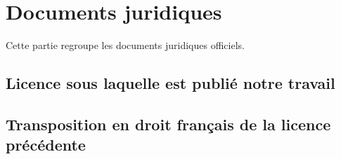 \chapter{Documents juridiques}
\label{chap-juridique}

Cette partie regroupe les documents juridiques officiels.

\section*{Licence sous laquelle est publié notre travail}
\label{sec-discours}

\lipsum[11-15]

\section*{Transposition en droit français de la licence précédente}
\label{sec-autre-discours}

\lipsum[16-20]

